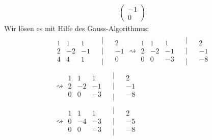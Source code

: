 \documentclass[11pt,a4paper]{scrartcl} %
\begin{document}
\begin{itemize}
\begin{align*}
\begin{pmatrix}
-1 \\
0
\end{pmatrix}
\end{align*}
Wir lösen es mit Hilfe des Gauss-Algorithmus:
\begin{align*}
\begin{matrix}
1 & 1 & 1 & \\
2 & -2 & -1 & \\
4 & 4 & 1 &
\end{matrix}
\begin{matrix}
\mid &  \\
\mid & \\
\mid &
\end{matrix}
\begin{matrix}
2 \\
-1 \\
0
\end{matrix}
\rightsquigarrow
\begin{matrix}
1 & 1 & 1 & \\
2 & -2 & -1 & \\
0 & 0 & -3 &
\end{matrix}
\begin{matrix}
\mid &  \\
\mid & \\
\mid &
\end{matrix}
\begin{matrix}
2 \\
-1 \\
-8
\end{matrix} \\
\rightsquigarrow
\begin{matrix}
1 & 1 & 1 & \\
2 & -2 & -1 & \\
0 & 0 & -3 &
\end{matrix}
\begin{matrix}
\mid &  \\
\mid & \\
\mid &
\end{matrix}
\begin{matrix}
2 \\
-1 \\
-8
\end{matrix} \\
\rightsquigarrow
\begin{matrix}
1 & 1 & 1 & \\
0 & -4 & -3 & \\
0 & 0 & -3 &
\end{matrix}
\begin{matrix}
\mid &  \\
\mid & \\
\mid &
\end{matrix}
\begin{matrix}
2 \\
-5 \\
-8
\end{matrix}
\end{align*}
\end{itemize}
\newpage
\end{document}
